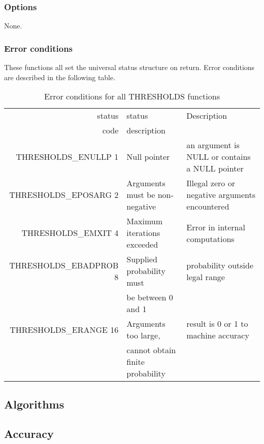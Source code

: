 \documentclass{article}
\begin{document}
\subsubsection{Options}

None. 

\subsubsection{Error conditions}


These functions all set the universal status structure on return.
Error conditions are described in the following table.

\begin{table}
\begin{tabular}{|r|l|p{2in}|}\hline
status  & status          & Description\\
code    & description     & \\\hline
THRESHOLDS\_ENULLP 1   & Null pointer
  & an argument is NULL or contains a NULL pointer\\
THRESHOLDS\_EPOSARG 2   & Arguments must be non-negative
  & Illegal zero or negative arguments encountered \\
THRESHOLDS\_EMXIT 4   & Maximum iterations exceeded
  & Error in internal computations\\
THRESHOLDS\_EBADPROB 8  & Supplied probability must 
  & probability outside legal range\\ 
 \, & be between 0 and 1
 & \, \\
THRESHOLDS\_ERANGE 16  & Arguments too large,
  & result is 0 or 1 to machine accuracy\\ 
 \, & cannot obtain finite probability
 & \, \\

\hline
\end{tabular}
\caption{Error conditions for all THRESHOLDS functions}\label{tbl:CV}
\end{table}
                                
\subsection{Algorithms}



\subsection{Accuracy}
\end{document}
